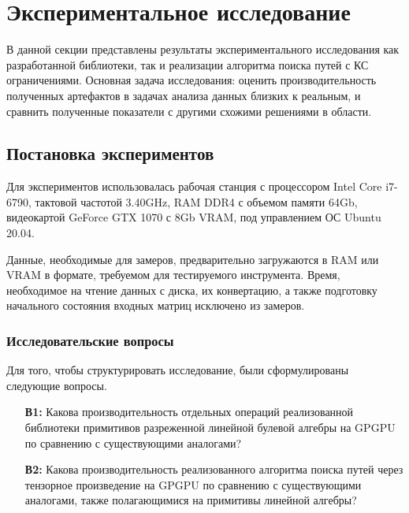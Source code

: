 \section{Экспериментальное исследование}

В данной секции представлены результаты экспериментального исследования как разработанной библиотеки, так и реализации алгоритма поиска путей с КС ограничениями.
Основная задача исследования: оценить производительность полученных артефактов в задачах анализа данных близких к реальным, и сравнить полученные показатели с другими схожими решениями в области.

\subsection{Постановка экспериментов}

Для экспериментов использовалась рабочая станция с процессором Intel Core i7-6790, тактовой частотой 3.40GHz, RAM DDR4 с объемом памяти 64Gb, видеокартой GeForce GTX 1070 с 8Gb VRAM, под управлением ОС Ubuntu 20.04.

Данные, необходимые для замеров, предварительно загружаются в RAM или VRAM в формате, требуемом для тестируемого инструмента. Время, необходимое на чтение данных с диска, их конвертацию, а также подготовку начального состояния входных матриц исключено из замеров. 

\subsubsection*{Исследовательские вопросы}

Для того, чтобы структурировать исследование, были сформулированы следующие вопросы.

\begin{itemize}
   \item[\textbf{В1:}] Какова производительность отдельных операций реализованной библиотеки примитивов разреженной линейной булевой алгебры на GPGPU по сравнению с существующими аналогами?
   
   \item[\textbf{В2:}] Какова производительность реализованного алгоритма поиска путей через тензорное произведение на GPGPU  по сравнению с существующими аналогами, также полагающимися на примитивы линейной алгебры? 
\end{itemize}

